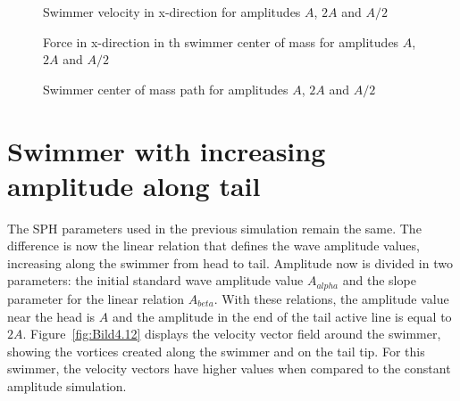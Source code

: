 \begin{figure}[H]
\centering
  \begin{footnotesize}
  
  \caption[Swimmer velocity in x-direction for amplitudes $A$, $2A$ and $A/2$ ]{Swimmer velocity in x-direction for amplitudes $A$, $2A$ and $A/2$ }
   \label{fig:Bild4.9}
  \end{footnotesize}
\end{figure} 

\begin{figure}[H]
\centering
  \begin{footnotesize}
  
  \caption[Force in x-direction in th swimmer center of mass for amplitudes $A$, $2A$ and $A/2$]{Force in x-direction in th swimmer center of mass for amplitudes $A$, $2A$ and $A/2$}
   \label{fig:Bild4.10}
  \end{footnotesize}
\end{figure} 

\begin{figure}[H]
\centering
  \begin{footnotesize}
  
  \caption[Swimmer center of mass path for amplitudes $A$, $2A$ and $A/2$]{Swimmer center of mass path for amplitudes $A$, $2A$ and $A/2$}
   \label{fig:Bild4.11}
  \end{footnotesize}
\end{figure}


\section{Swimmer with increasing amplitude along tail}
\label{sec:section 4}

The SPH parameters used in the previous simulation remain the same. The difference is now the linear relation that defines the wave amplitude values, increasing along the swimmer
from head to tail. Amplitude now is divided in two parameters: the initial standard wave amplitude value $A_{alpha}$ and the slope parameter for the linear relation $A_{beta}$.
With these relations, the amplitude value near the head is $A$ and the amplitude in the end of the tail active line is equal to $2A$. Figure~\ref{fig:Bild4.12} displays the velocity
vector field around the swimmer, showing the vortices created along the swimmer and on the tail tip. For this swimmer, the velocity vectors have higher values when compared to the
constant amplitude simulation.
 


